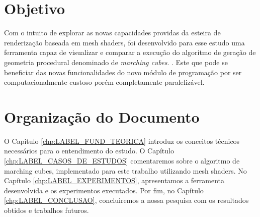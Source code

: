 \section{Objetivo}

Com o intuito de explorar as novas capacidades providas da esteira de renderização baseada em mesh shaders, foi desenvolvido para esse estudo uma ferramenta capaz de visualizar e comparar a execução do algoritmo de geração de geometria procedural \cite{REF_BOOK_PROCEDURAL_MODELING} denominado de \textit{marching cubes}. \cite{REF_ART_MARCHING_CUBES}. Este que pode se beneficiar das novas funcionalidades do novo módulo de programação por ser computacionalmente custoso porém completamente paralelizável.

\section{Organização do Documento}

O Capitulo \ref{chp:LABEL_FUND_TEORICA} introduz os conceitos técnicos necessários para o entendimento do estudo. O Capítulo \ref{chp:LABEL_CASOS_DE_ESTUDOS} comentaremos sobre o algoritmo de marching cubes, implementado para este trabalho utilizando mesh shaders. No Capítulo \ref{chp:LABEL_EXPERIMENTOS}, apresentamos a ferramenta desenvolvida e os experimentos executados. 
Por fim, no Capítulo \ref{chp:LABEL_CONCLUSAO}, concluiremos a nossa pesquisa com os resultados obtidos e trabalhos futuros.